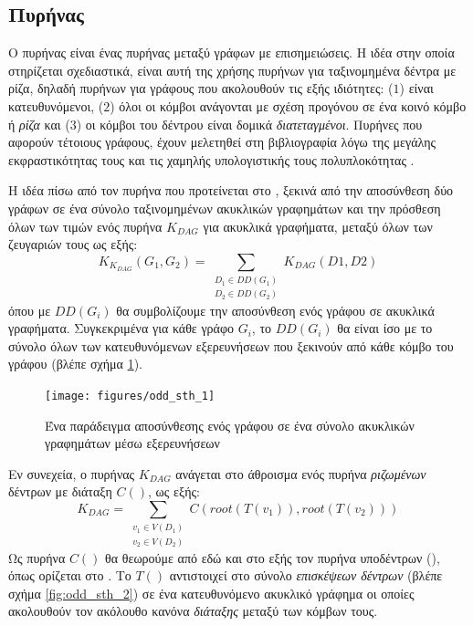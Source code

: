 \subsection{Πυρήνας }
\label{ssec:odd-sth}
Ο πυρήνας  είναι ένας πυρήνας μεταξύ γράφων με επισημειώσεις.
Η ιδέα στην οποία στηρίζεται σχεδιαστικά, είναι αυτή της χρήσης πυρήνων για ταξινομημένα δέντρα με ρίζα, δηλαδή πυρήνων για γράφους που ακολουθούν τις εξής ιδιότητες: ($1$) είναι κατευθυνόμενοι, ($2$) όλοι οι κόμβοι ανάγονται με σχέση προγόνου σε ένα κοινό κόμβο ή \textit{ρίζα} και ($3$) οι κόμβοι του δέντρου είναι δομικά \textit{διατεταγμένοι}.
Πυρήνες που αφορούν τέτοιους γράφους, έχουν μελετηθεί στη βιβλιογραφία λόγω της μεγάλης εκφραστικότητας τους και τις χαμηλής υπολογιστικής τους πολυπλοκότητας \cite{Haussler99ck, MA_ECML_2006, Vishwanathan2002}.\par
Η ιδέα πίσω από τον πυρήνα  που προτείνεται στο \cite{Martino2012ATK}, ξεκινά από την αποσύνθεση δύο γράφων σε ένα σύνολο ταξινομημένων ακυκλικών γραφημάτων και την πρόσθεση όλων των τιμών ενός πυρήνα $K_{DAG}$ για ακυκλικά γραφήματα, μεταξύ όλων των ζευγαριών τους ως εξής:
\begin{equation}
K_{K_{DAG}}(G_{1}, G_{2}) = \sum_{\substack{D_{1} \in DD(G_{1}) \\
D_{2} \in DD(G_{2})}} K_{DAG}(D1, D2)
\end{equation}
όπου με $DD(G_{i})$ θα συμβολίζουμε την αποσύνθεση ενός γράφου σε ακυκλικά γραφήματα.
Συγκεκριμένα για κάθε γράφο $G_{i}$, το $DD(G_{i})$ θα είναι ίσο με το σύνολο όλων των κατευθυνόμενων εξερευνήσεων  που ξεκινούν από κάθε κόμβο του γράφου (βλέπε σχήμα \ref{fig:odd:bfs_explorations}).
\begin{figure}[]
\centering
\texttt{[image: figures/odd\_sth\_1]}
\caption{Ένα παράδειγμα αποσύνθεσης ενός γράφου σε ένα σύνολο ακυκλικών γραφημάτων μέσω εξερευνήσεων }
\label{fig:odd:bfs_explorations}
\end{figure}
Εν συνεχεία, ο πυρήνας $K_{DAG}$ ανάγεται στο άθροισμα ενός πυρήνα \textit{ριζωμένων} δέντρων με διάταξη $C()$, ως εξής:
\begin{equation}
K_{DAG} = \sum_{\substack{v_{1} \in V(D_{1}) \\ v_{2} \in V(D_{2})}} C(root(T(v_{1})), root(T(v_{2})))
\end{equation}
Ως πυρήνα $C()$ θα θεωρούμε από εδώ και στο εξής τον πυρήνα υποδέντρων (), όπως ορίζεται στο \cite{STKernel}.
Το $T()$ αντιστοιχεί στο σύνολο \textit{επισκέψεων δέντρων} (βλέπε σχήμα \ref{fig:odd_sth_2}) σε ένα κατευθυνόμενο ακυκλικό γράφημα οι οποίες ακολουθούν τον ακόλουθο κανόνα \textit{διάταξης} μεταξύ των κόμβων τους.
